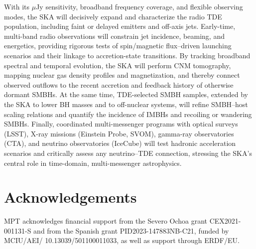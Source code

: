 \documentclass[a4paper,11pt]{article}
\begin{document}
With its $\mu$Jy sensitivity, broadband frequency coverage, and flexible observing modes, the SKA will decisively expand and characterize the radio TDE population, including faint or delayed emitters and off-axis jets. Early-time, multi-band radio observations will constrain jet incidence, beaming, and energetics, providing rigorous tests of spin/magnetic flux--driven launching scenarios and their linkage to accretion-state transitions. By tracking broadband spectral and temporal evolution, the SKA will perform CNM tomography, mapping nuclear gas density profiles and magnetization, and thereby connect observed outflows to the recent accretion and feedback history of otherwise dormant SMBHs. At the same time, TDE-selected SMBH samples, extended by the SKA to lower BH masses and to off-nuclear systems, will refine SMBH--host scaling relations and quantify the incidence of IMBHs and recoiling or wandering SMBHs. Finally, coordinated multi-messenger programs with optical surveys (LSST), X-ray missions (Einstein Probe, SVOM), gamma-ray observatories (CTA), and neutrino observatories (IceCube) will test hadronic acceleration scenarios and critically assess any neutrino--TDE connection, stressing the SKA's central role in time-domain, multi-messenger astrophysics.

\section*{Acknowledgements}
MPT acknowledges financial support from the Severo Ochoa grant CEX2021-001131-S and from the Spanish grant PID2023-147883NB-C21, funded by MCIU/AEI/ 10.13039/501100011033, as well as support through ERDF/EU.



\end{document}

